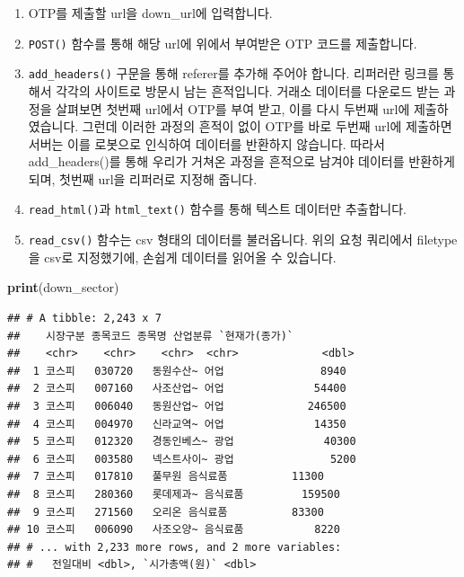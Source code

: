 \documentclass[12pt,]{book}
\newenvironment{Shaded}{\begin{snugshade}}{\end{snugshade}}
\newcommand{\DataTypeTok}[1]{\textcolor[rgb]{0.13,0.29,0.53}{#1}}
\newcommand{\KeywordTok}[1]{\textcolor[rgb]{0.13,0.29,0.53}{\textbf{#1}}}
\newcommand{\NormalTok}[1]{#1}
\newcommand{\OperatorTok}[1]{\textcolor[rgb]{0.81,0.36,0.00}{\textbf{#1}}}
\newcommand{\StringTok}[1]{\textcolor[rgb]{0.31,0.60,0.02}{#1}}
\providecommand{\tightlist}{%
  \setlength{\itemsep}{0pt}\setlength{\parskip}{0pt}}
\begin{document}
\begin{Shaded}
\end{Shaded}

\begin{enumerate}
\def\labelenumi{\arabic{enumi}.}
\tightlist
\item
  OTP를 제출할 url을 down\_url에 입력합니다.
\item
  \texttt{POST()} 함수를 통해 해당 url에 위에서 부여받은 OTP 코드를 제출합니다.
\item
  \texttt{add\_headers()} 구문을 통해 referer를 추가해 주어야 합니다. 리퍼러란 링크를 통해서 각각의 사이트로 방문시 남는 흔적입니다. 거래소 데이터를 다운로드 받는 과정을 살펴보면 첫번째 url에서 OTP를 부여 받고, 이를 다시 두번째 url에 제출하였습니다. 그런데 이러한 과정의 흔적이 없이 OTP를 바로 두번째 url에 제출하면 서버는 이를 로봇으로 인식하여 데이터를 반환하지 않습니다. 따라서 add\_headers()를 통해 우리가 거쳐온 과정을 흔적으로 남겨야 데이터를 반환하게 되며, 첫번째 url을 리퍼러로 지정해 줍니다.
\item
  \texttt{read\_html()}과 \texttt{html\_text()} 함수를 통해 텍스트 데이터만 추출합니다.
\item
  \texttt{read\_csv()} 함수는 csv 형태의 데이터를 불러옵니다. 위의 요청 쿼리에서 filetype을 csv로 지정했기에, 손쉽게 데이터를 읽어올 수 있습니다.
\end{enumerate}

\begin{Shaded}
\begin{Highlighting}[]
\KeywordTok{print}\NormalTok{(down_sector)}
\end{Highlighting}
\end{Shaded}

\begin{verbatim}
## # A tibble: 2,243 x 7
##    시장구분 종목코드 종목명 산업분류 `현재가(종가)`
##    <chr>    <chr>    <chr>  <chr>             <dbl>
##  1 코스피   030720   동원수산~ 어업               8940
##  2 코스피   007160   사조산업~ 어업              54400
##  3 코스피   006040   동원산업~ 어업             246500
##  4 코스피   004970   신라교역~ 어업              14350
##  5 코스피   012320   경동인베스~ 광업              40300
##  6 코스피   003580   넥스트사이~ 광업               5200
##  7 코스피   017810   풀무원 음식료품          11300
##  8 코스피   280360   롯데제과~ 음식료품         159500
##  9 코스피   271560   오리온 음식료품          83300
## 10 코스피   006090   사조오양~ 음식료품           8220
## # ... with 2,233 more rows, and 2 more variables:
## #   전일대비 <dbl>, `시가총액(원)` <dbl>
\end{verbatim}
\end{document}
